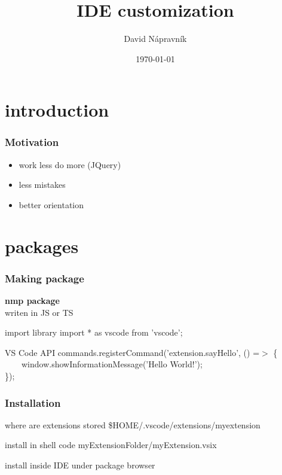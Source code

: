 \documentclass{beamer}
\title[Short title]{IDE customization} %
\author{David Nápravník} %
\institute[mff] %
{
Charles University \\ %
\medskip
\textit{ebrithil@nogare.cz} %
}
\date{\today} %
\begin{document}
\begin{frame}
\titlepage %
\end{frame}


\section{introduction}

\begin{frame}
\frametitle{Motivation}
\begin{itemize}
\item work less do more (JQuery)
\item less mistakes
\item better orientation
\end{itemize}
\end{frame}


\section{packages}
\begin{frame}
\frametitle{Making package}
\textbf{nmp package}\\
writen in JS or TS
\begin{block}{import library}
import * as vscode from 'vscode';
\end{block}

\begin{block}{VS Code API}
commands.registerCommand('extension.sayHello', () =$>$ \{\\
~~~~window.showInformationMessage('Hello World!');\\
\});
\end{block}
\end{frame}

\begin{frame}
\frametitle{Installation}
\begin{block}{where are extensions stored}
\$HOME/.vscode/extensions/myextension
\end{block}
\begin{block}{install in shell}
code myExtensionFolder/myExtension.vsix
\end{block}
install inside IDE under package browser
\end{frame}
\end{document}
